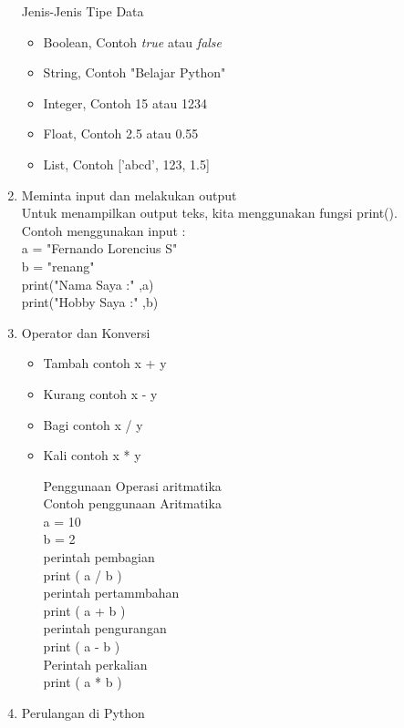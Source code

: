 \begin{enumerate}
Jenis-Jenis Tipe Data\\
\begin{itemize}
\item Boolean, Contoh \textit{true} atau \textit{false}
\item String, Contoh "Belajar Python"
\item Integer, Contoh 15 atau 1234
\item Float, Contoh 2.5 atau 0.55
\item List, Contoh ['abcd', 123, 1.5]
\end{itemize}
\item Meminta input dan melakukan output\\
Untuk menampilkan output teks, kita menggunakan fungsi print().\\
Contoh menggunakan input :\\
a = "Fernando Lorencius S"\\
b = "renang"\\

print("Nama Saya :" ,a)\\
print("Hobby Saya :" ,b)\\

\item Operator dan Konversi
\begin{itemize}

\item Tambah contoh x + y
\item Kurang contoh x - y
\item Bagi contoh x / y
\item Kali contoh x * y

Penggunaan Operasi aritmatika\\
Contoh penggunaan Aritmatika\\
a = 10\\
b = 2\\

perintah pembagian\\
print ( a / b )\\
perintah pertammbahan\\
print ( a + b )\\
perintah pengurangan\\
print ( a - b )\\
Perintah perkalian\\
print ( a * b )\\

\end{itemize}
\item Perulangan di Python


\end{enumerate}
